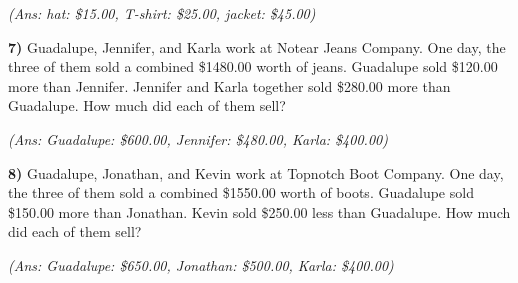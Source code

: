 \documentclass[10pt,letterpaper]{memoir}
\begin{document}
\myWideMatrixTable[-0.1in]

\vspace{0.5in}
\hfill{\itshape (Ans: hat: \$15.00, T-shirt: \$25.00, jacket: \$45.00)}
\vspace{2em}



\newpage
{\bfseries\large 7)} 
Guadalupe, Jennifer, and Karla work at Notear Jeans Company.
One day, the three of them sold a combined \$1480.00 worth of jeans.
Guadalupe sold \$120.00 more than Jennifer.
Jennifer and Karla together sold \$280.00 more than Guadalupe.
How much did each of them sell?

\myWideMatrixTable[-0.1in]

\vspace{0.5in}
\hfill{\itshape (Ans: Guadalupe: \$600.00, Jennifer: \$480.00, Karla: \$400.00)}
\vspace{2em}




{\bfseries\large 8)} 
Guadalupe, Jonathan, and Kevin work at Topnotch Boot Company.
One day, the three of them sold a combined \$1550.00 worth of boots.
Guadalupe sold \$150.00 more than Jonathan.
Kevin sold \$250.00 less than Guadalupe.
How much did each of them sell?

\myWideMatrixTable[-0.1in]

\vspace{0.5in}
\hfill{\itshape (Ans: Guadalupe: \$650.00, Jonathan: \$500.00, Karla: \$400.00)}
\vspace{2em}
\end{document}
